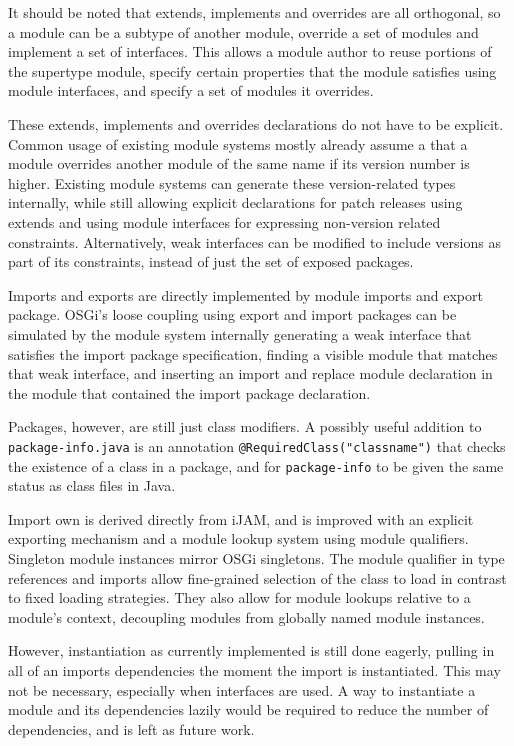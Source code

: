 It should be noted that extends, implements and overrides are all orthogonal,
so a module can be a subtype of another module, override a set of modules and
implement a set of interfaces. This allows a module author to reuse portions
of the supertype module, specify certain properties that the module satisfies
using module interfaces, and specify a set of modules it overrides.

These extends, implements and overrides declarations do not have to be explicit.
Common usage of existing module systems mostly already assume a that a 
module overrides another module of the same name if its version 
number is higher. Existing module systems can generate these version-related types 
internally, while still allowing explicit declarations for patch releases 
using extends and using module interfaces for expressing non-version
related constraints. Alternatively, weak interfaces can be modified to include
versions as part of its constraints, instead of just the set of exposed packages.


Imports and exports are directly implemented by module imports and export package.
OSGi's loose coupling using export and import packages can be simulated by
the module system internally generating a weak interface that satisfies the import
package specification, finding a visible module that matches that weak interface, and
inserting an import and replace module declaration in the module that contained the import package
declaration.

Packages, however, are still just class modifiers. A possibly useful addition to 
\texttt{package-info.java} is an annotation \texttt{@RequiredClass("classname")}
that checks the existence of a class in a package, and for \texttt{package-info}
to be given the same status as class files in Java.


Import own is derived directly from iJAM, and is improved with an explicit exporting 
mechanism and a module lookup system using module qualifiers. Singleton module instances mirror
OSGi singletons. The module qualifier in type references and
imports allow fine-grained selection of the class to load in contrast
to fixed loading strategies. They also allow for module lookups relative to
a module's context, decoupling modules from globally named module instances.

However, instantiation as currently implemented is still done eagerly, pulling in all
of an imports dependencies the moment the import is instantiated. This may not be necessary,
especially when interfaces are used. A way to instantiate a module and its dependencies 
lazily would be required to reduce the number of dependencies, and is left as future work.

